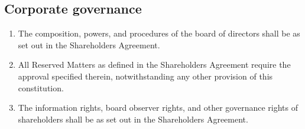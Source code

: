 \subsection{Corporate governance}

\begin{enumerate}[label=(\alph*)]
    \item The composition, powers, and procedures of the board of directors shall be as set out in the Shareholders Agreement.
    
    \item All Reserved Matters as defined in the Shareholders Agreement require the approval specified therein, notwithstanding any other provision of this constitution.
    
    \item The information rights, board observer rights, and other governance rights of shareholders shall be as set out in the Shareholders Agreement.
\end{enumerate} 